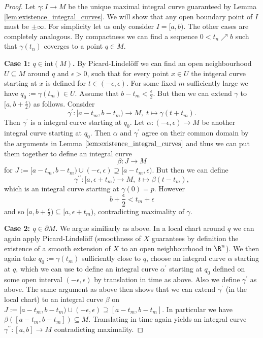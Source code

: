\begin{proof}
Let $\gamma \colon I \to M$ be the unique maximal integral curve guaranteed by Lemma \ref{lem:existence_integral_curves}. We will show that any open boundary point of $I$ must be $\pm \infty$. For simplicity let us only consider $I = [a,b)$. The other cases are completely analogous. By compactness we can find a sequence $0 < t_n \nearrow b$ such that $\gamma(t_n)$ coverges to a point $q \in M$.

\noindent \textbf{Case 1: $q \in \mathrm{int}(M)$.} By Picard-Lindelöff we can find an open neighbourhood $U \subseteq M$ around $q$ and $\epsilon > 0$, such that for every point $x \in U$ the intgeral curve starting at $x$ is defined for $t \in (-\epsilon,\epsilon)$. For some fixed $m$ sufficiently large we have $q_0 := \gamma(t_m) \in U$. Assume that $b - t_m < \frac{\epsilon}{2}$. But then we can extend $\gamma$ to $[a,b + \frac{\epsilon}{2})$ as follows. Consider
\[
\gamma^\prime \colon [a-t_m,b-t_m) \to M, \; t \mapsto \gamma(t + t_m).
\]
Then $\gamma^\prime$ is a integral curve starting at $q_0$. Let $\alpha \colon (-\epsilon,\epsilon) \to M$ be another integral curve starting at $q_0$. Then $\alpha$ and $\gamma^\prime$ agree on their common domain by the arguments in Lemma $\ref{lem:existence_integral_curves}$ and thus we can put them together to define an integral curve 
\[
\beta \colon J \to M
\]
for $J := [a-t_m,b-t_m) \cup (-\epsilon,\epsilon) \supseteq [a-t_m,\epsilon)$. But then we can define
\[
\gamma^{\prime\prime} \colon [a,\epsilon + t_m) \to M, \; t \mapsto \beta(t-t_m),
\]
which is an integral curve starting at $\gamma(0) = p$. However
\[
b + \frac{\epsilon}{2} < t_m + \epsilon
\]
and so $[a,b + \frac{\epsilon}{2}) \subseteq [a,\epsilon + t_m)$, contradicting maximality of $\gamma$.

\noindent \textbf{Case 2: $q \in \partial M$.} We argue similiarly as above. In a local chart around $q$ we can again apply Picard-Lindelöff (smoothness of $X$ guarantees by definition the existence of a smooth extension of $X$ to an open neighbourhood in $\R^n$). We then again take $q_0 := \gamma(t_m)$ sufficiently close to $q$, choose an integral curve $\alpha$ starting at $q$, which we can use to define an integral curve $\alpha^\prime$ starting at $q_0$ defined on some open interval $(-\epsilon,\epsilon) $ by translation in time as above. Also we define $\gamma^\prime$ as above. The same argument as above then shows that we can extend $\gamma^\prime$ (in the local chart) to an integral curve $\beta$ on $J := [a-t_m,b-t_m) \cup (-\epsilon,\epsilon) \supseteq [a-t_m,b-t_m]$. In particular we have $\beta([a-t_m,b-t_m]) \subseteq M$. Translating in time again yields an integral curve $\gamma^{\prime\prime} \colon [a,b] \to M$ contradicting maximality.
\end{proof}


